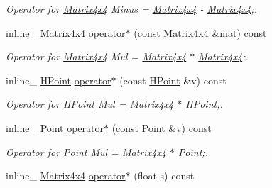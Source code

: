 \begin{DoxyCompactItemize}
\begin{DoxyCompactList}\small\item\em Operator for \hyperlink{class_matrix4x4}{Matrix4x4} Minus = \hyperlink{class_matrix4x4}{Matrix4x4} -\/ \hyperlink{class_matrix4x4}{Matrix4x4};. \end{DoxyCompactList}\item 
\hypertarget{class_matrix4x4_a132acb947401a0bc2234734f7ab21d0f}{inline\+\_\+ \hyperlink{class_matrix4x4}{Matrix4x4} \hyperlink{class_matrix4x4_a132acb947401a0bc2234734f7ab21d0f}{operator$\ast$} (const \hyperlink{class_matrix4x4}{Matrix4x4} \&mat) const }\label{class_matrix4x4_a132acb947401a0bc2234734f7ab21d0f}

\begin{DoxyCompactList}\small\item\em Operator for \hyperlink{class_matrix4x4}{Matrix4x4} Mul = \hyperlink{class_matrix4x4}{Matrix4x4} $\ast$ \hyperlink{class_matrix4x4}{Matrix4x4};. \end{DoxyCompactList}\item 
\hypertarget{class_matrix4x4_a8b7f21ba3d530e8bcf9185316fbfb67c}{inline\+\_\+ \hyperlink{class_h_point}{H\+Point} \hyperlink{class_matrix4x4_a8b7f21ba3d530e8bcf9185316fbfb67c}{operator$\ast$} (const \hyperlink{class_h_point}{H\+Point} \&v) const }\label{class_matrix4x4_a8b7f21ba3d530e8bcf9185316fbfb67c}

\begin{DoxyCompactList}\small\item\em Operator for \hyperlink{class_h_point}{H\+Point} Mul = \hyperlink{class_matrix4x4}{Matrix4x4} $\ast$ \hyperlink{class_h_point}{H\+Point};. \end{DoxyCompactList}\item 
\hypertarget{class_matrix4x4_a3eafefe4cd0c934439f88831f4b0864a}{inline\+\_\+ \hyperlink{class_point}{Point} \hyperlink{class_matrix4x4_a3eafefe4cd0c934439f88831f4b0864a}{operator$\ast$} (const \hyperlink{class_point}{Point} \&v) const }\label{class_matrix4x4_a3eafefe4cd0c934439f88831f4b0864a}

\begin{DoxyCompactList}\small\item\em Operator for \hyperlink{class_point}{Point} Mul = \hyperlink{class_matrix4x4}{Matrix4x4} $\ast$ \hyperlink{class_point}{Point};. \end{DoxyCompactList}\item 
\hypertarget{class_matrix4x4_a809c4a13de14973308a8cabc74409990}{inline\+\_\+ \hyperlink{class_matrix4x4}{Matrix4x4} \hyperlink{class_matrix4x4_a809c4a13de14973308a8cabc74409990}{operator$\ast$} (float s) const }\label{class_matrix4x4_a809c4a13de14973308a8cabc74409990}


\end{DoxyCompactItemize}

